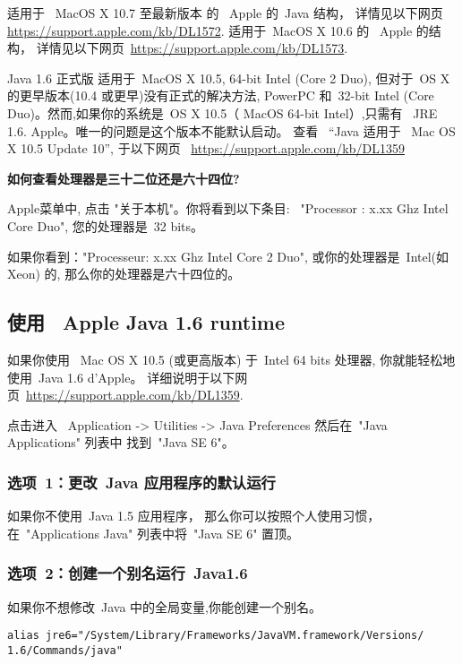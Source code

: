 \bigskip
\noindent 适用于 \ MacOS X 10.7 至最新版本 的 \ Apple 的\ Java 结构，
	详情见以下网页 \url{https://support.apple.com/kb/DL1572}. 
	适用于\  MacOS X 10.6 的 \ Apple 的结构，
	详情见以下网页\  \url{https://support.apple.com/kb/DL1573}.

\bigskip
\noindent Java 1.6 正式版 适用于\ MacOS X 10.5, 64-bit Intel (Core 2 Duo), 但对于\ OS X 的更早版本(10.4 或更早)没有正式的解决方法,
PowerPC 和\ 32-bit Intel (Core Duo)。然而,如果你的系统是\ OS X 10.5（ MacOS 64-bit Intel）,只需有 \ JRE 1.6. Apple。唯一的问题是这个版本不能默认启动。
	查看 \ ``Java 适用于 \ Mac OS X 10.5 Update 10'', 于以下网页 \ \url{https://support.apple.com/kb/DL1359}


\noindent\textbf{如何查看处理器是三十二位还是六十四位?}

\noindent Apple菜单中, 点击 "关于本机"。你将看到以下条目:
\ "Processor : x.xx Ghz Intel Core Duo", 您的处理器是\ 32 bits。

\bigskip
\noindent 如果你看到："Processeur: x.xx Ghz Intel Core 2 Duo", 或你的处理器是\ Intel(如Xeon) 的, 那么你的处理器是六十四位的。

\subsection{使用 \ Apple Java 1.6 runtime}
\bigskip{}
\noindent 如果你使用 \ Mac OS X 10.5 (或更高版本) 于\ Intel 64 bits 处理器, 你就能轻松地使用\ Java 1.6 d'Apple。
详细说明于以下网页\  \url{https://support.apple.com/kb/DL1359}.

\noindent 点击进入 \ Application -> Utilities -> Java Preferences 
 然后在\ "Java Applications" 列表中 找到\ "Java SE 6"。

\subsubsection{选项\ 1：更改\ Java 应用程序的默认运行}
\noindent 如果你不使用\ Java 1.5 应用程序，
那么你可以按照个人使用习惯，在\ "Applications Java" 列表中将\ "Java SE 6" 置顶。

\subsubsection{选项\ 2：创建一个别名运行\ Java1.6}
\noindent 如果你不想修改\ Java 中的全局变量,你能创建一个别名。

\bigskip
\noindent \verb+alias jre6="/System/Library/Frameworks/JavaVM.framework/Versions/+
\noindent \verb+1.6/Commands/java"+
   
